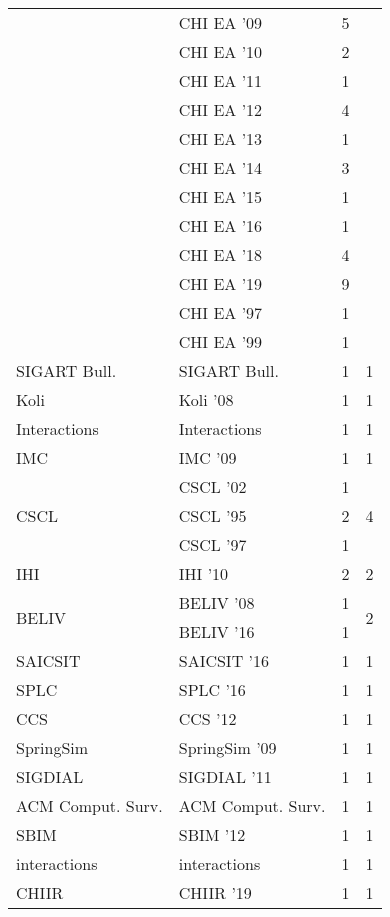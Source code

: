 \begin{table*}[t]
\begin{tabular}{llrr}
& CHI EA '09 & 5 &\\
& CHI EA '10 & 2 &\\
& CHI EA '11 & 1 &\\
& CHI EA '12 & 4 &\\
& CHI EA '13 & 1 &\\
& CHI EA '14 & 3 &\\
& CHI EA '15 & 1 &\\
& CHI EA '16 & 1 &\\
& CHI EA '18 & 4 &\\
& CHI EA '19 & 9 &\\
& CHI EA '97 & 1 &\\
& CHI EA '99 & 1 &\\
\multirow{1}{*}{SIGART Bull.} & SIGART Bull. & 1 & \multirow{1}{*}{1}\\
\multirow{1}{*}{Koli } & Koli '08 & 1 & \multirow{1}{*}{1}\\
\multirow{1}{*}{Interactions} & Interactions & 1 & \multirow{1}{*}{1}\\
\multirow{1}{*}{IMC } & IMC '09 & 1 & \multirow{1}{*}{1}\\
\multirow{3}{*}{CSCL } & CSCL '02 & 1 & \multirow{3}{*}{4}\\
& CSCL '95 & 2 &\\
& CSCL '97 & 1 &\\
\multirow{1}{*}{IHI } & IHI '10 & 2 & \multirow{1}{*}{2}\\
\multirow{2}{*}{BELIV } & BELIV '08 & 1 & \multirow{2}{*}{2}\\
& BELIV '16 & 1 &\\
\multirow{1}{*}{SAICSIT } & SAICSIT '16 & 1 & \multirow{1}{*}{1}\\
\multirow{1}{*}{SPLC } & SPLC '16 & 1 & \multirow{1}{*}{1}\\
\multirow{1}{*}{CCS } & CCS '12 & 1 & \multirow{1}{*}{1}\\
\multirow{1}{*}{SpringSim } & SpringSim '09 & 1 & \multirow{1}{*}{1}\\
\multirow{1}{*}{SIGDIAL } & SIGDIAL '11 & 1 & \multirow{1}{*}{1}\\
\multirow{1}{*}{ACM Comput. Surv.} & ACM Comput. Surv. & 1 & \multirow{1}{*}{1}\\
\multirow{1}{*}{SBIM } & SBIM '12 & 1 & \multirow{1}{*}{1}\\
\multirow{1}{*}{interactions} & interactions & 1 & \multirow{1}{*}{1}\\
\multirow{1}{*}{CHIIR } & CHIIR '19 & 1 & \multirow{1}{*}{1}\\

\end{tabular}
\end{table*}
